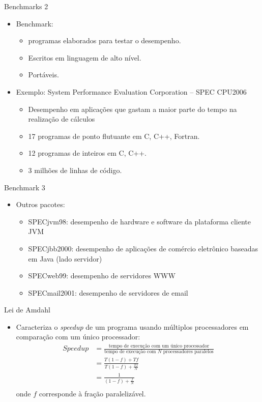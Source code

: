 \begin{slide}{Benchmarks 2}
\begin{itemize}
   \item Benchmark: 
   \begin{itemize}
      \item programas elaborados para testar o desempenho.
      \item Escritos em linguagem de alto nível.
      \item Portáveis.
\end{itemize}
   \item Exemplo: System Performance Evaluation Corporation -- SPEC CPU2006
   \begin{itemize}
      \item Desempenho em aplicações que gastam a maior parte do tempo na realização de cálculos
      \item 17 programas de ponto flutuante em C, C++, Fortran.
      \item 12 programas de inteiros em C, C++.
      \item 3 milhões de linhas de código.
   \end{itemize}
\end{itemize}
\end{slide}

\begin{slide}{Benchmark 3}
\begin{itemize}
   \item Outros pacotes:
   \begin{itemize}
      \item SPECjvm98: desempenho de hardware e software da plataforma cliente JVM
      \item SPECjbb2000: desempenho de aplicações de comércio eletrônico baseadas em Java (lado servidor)
      \item SPECweb99: desempenho de servidores WWW
      \item SPECmail2001: desempenho de servidores de email
   \end{itemize}
   
\end{itemize}
\end{slide}

\begin{slide}{Lei de Amdahl}
\begin{itemize}
   \item Caracteriza o \textit{speedup} de um programa usando múltiplos processadores em comparação com um único processador:
   \begin{align*}
      Speedup &= \frac{\text{tempo de execução com um único processador}}{\text{tempo de execução com $N$ processadores paralelos}}\\
              &= \frac{T(1-f)+Tf}{T(1-f)+\frac{Tf}{N}}\\
              &= \frac{1}{(1-f)+\frac{f}{N}}\\
   \end{align*}
   onde $f$ corresponde à fração paralelizável.
\end{itemize}
\end{slide}

